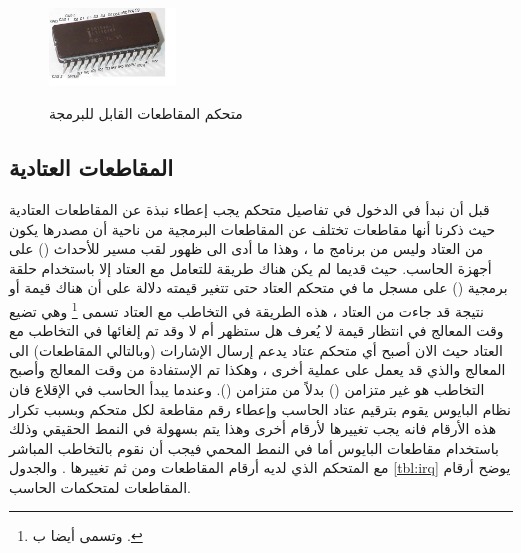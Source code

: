 \documentclass[document.tex]{subfiles}
\begin{document}
\begin{figure}[h!]
  \caption{متحكم المقاطعات القابل للبرمجة }
  \centering
   \includegraphics[width=0.3\textwidth]{../img/Intel-D8259A}
\label{fig:pic} 
\end{figure}


\subsection{المقاطعات العتادية }
قبل أن نبدأ في الدخول في تفاصيل متحكم  يجب إعطاء نبذة عن المقاطعات العتادية حيث ذكرنا أنها مقاطعات تختلف عن المقاطعات البرمجية من ناحية أن مصدرها يكون من العتاد وليس من برنامج ما ، وهذا ما أدى الى ظهور لقب مسير للأحداث () على أجهزة الحاسب. حيث قديما لم يكن هناك طريقة للتعامل مع العتاد إلا باستخدام حلقة برمجية () على مسجل ما في متحكم العتاد حتى تتغير قيمته دلالة على أن هناك قيمة أو نتيجة قد جاءت من العتاد ، هذه الطريقة في التخاطب مع العتاد تسمى \footnote{وتسمى أيضا ب .} وهي تضيع وقت المعالج في انتظار قيمة لا يُعرف هل ستظهر أم لا  وقد تم إلغائها في التخاطب مع العتاد حيث الان أصبح أي متحكم عتاد يدعم إرسال الإشارات (وبالتالي المقاطعات) الى المعالج والذي قد يعمل على عملية أخرى ، وهكذا تم الإستفادة من وقت المعالج وأصبح التخاطب هو غير متزامن () بدلاً من متزامن (). وعندما يبدأ الحاسب في الإقلاع فان نظام البايوس يقوم بترقيم عتاد الحاسب وإعطاء رقم مقاطعة لكل متحكم وبسبب تكرار هذه الأرقام فانه يجب تغييرها لأرقام أخرى وهذا يتم بسهولة في النمط الحقيقي وذلك باستخدام مقاطعات البايوس أما في النمط المحمي فيجب أن نقوم بالتخاطب المباشر مع المتحكم الذي لديه أرقام المقاطعات ومن ثم تغييرها . والجدول \ref{tbl:irq} يوضح أرقام المقاطعات لمتحكمات الحاسب.
\end{document}
